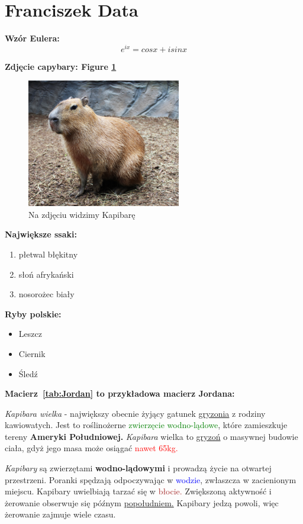 \section{Franciszek Data}
\label{sec:franek}

\textbf{Wzór Eulera:}
\[e^{ix} = cos x + isin x\]
\hspace{2cm}

\textbf{Zdjęcie capybary: Figure \ref{fig:capybara}} 

\begin{figure}[h]
    \centering
    \includegraphics[width=0.6\textwidth]{pictures/Capy.jpg}
    \caption{Na zdjęciu widzimy Kapibarę}
    \label{fig:capybara}
\end{figure}
\hspace{2cm}

\textbf{Największe ssaki:}
\begin{enumerate}
    \item płetwal błękitny
    \item słoń afrykański
    \item nosorożec biały
\end{enumerate}
\hspace{2cm}

\textbf{Ryby polskie:}
\begin{itemize}
    \item Leszcz
    \item Ciernik
    \item Śledź
\end{itemize}
\hspace{2cm}
\newpage

\textbf{Macierz~\ref{tab:Jordan} to przykładowa macierz Jordana:}

\hspace{2cm}

\textit{\Large{Kapibara wielka}} - największy obecnie żyjący gatunek \underline{gryzonia} z rodziny kawiowatych. Jest to roślinożerne \textcolor{green}{zwierzęcie wodno-lądowe}, które zamieszkuje tereny \textbf{Ameryki Południowej.} \textit{Kapibara} wielka to \underline{gryzoń} o masywnej budowie ciała, gdyż jego masa może osiągać \textcolor{red}{nawet 65kg.}\\\par
\textit{\Large{Kapibary}} są zwierzętami \textbf{wodno-lądowymi} i prowadzą życie na otwartej przestrzeni. Poranki spędzają odpoczywając w \textcolor{blue}{wodzie}, zwłaszcza w zacienionym miejscu. Kapibary uwielbiają tarzać się w \textcolor{brown}{błocie.} Zwiększoną aktywność i żerowanie obserwuje się późnym \underline{popołudniem.} Kapibary jedzą powoli, więc żerowanie zajmuje wiele czasu.